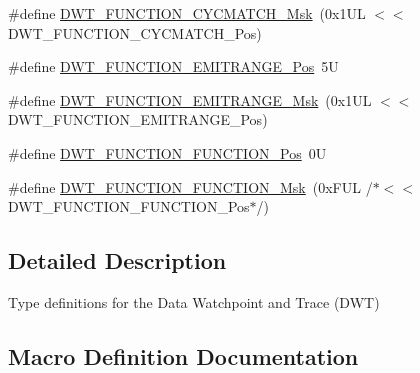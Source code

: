 \begin{DoxyCompactItemize}
\item 
\#define \hyperlink{group___c_m_s_i_s___d_w_t_ga8e2ed09bdd33a8f7f7ce0444f5f3bb25}{D\+W\+T\+\_\+\+F\+U\+N\+C\+T\+I\+O\+N\+\_\+\+C\+Y\+C\+M\+A\+T\+C\+H\+\_\+\+Msk}~(0x1\+U\+L $<$$<$ D\+W\+T\+\_\+\+F\+U\+N\+C\+T\+I\+O\+N\+\_\+\+C\+Y\+C\+M\+A\+T\+C\+H\+\_\+\+Pos)
\item 
\#define \hyperlink{group___c_m_s_i_s___d_w_t_ga41d5b332216baa8d29561260a1b85659}{D\+W\+T\+\_\+\+F\+U\+N\+C\+T\+I\+O\+N\+\_\+\+E\+M\+I\+T\+R\+A\+N\+G\+E\+\_\+\+Pos}~5U
\item 
\#define \hyperlink{group___c_m_s_i_s___d_w_t_gad46dd5aba29f2e28d4d3f50b1d291f41}{D\+W\+T\+\_\+\+F\+U\+N\+C\+T\+I\+O\+N\+\_\+\+E\+M\+I\+T\+R\+A\+N\+G\+E\+\_\+\+Msk}~(0x1\+U\+L $<$$<$ D\+W\+T\+\_\+\+F\+U\+N\+C\+T\+I\+O\+N\+\_\+\+E\+M\+I\+T\+R\+A\+N\+G\+E\+\_\+\+Pos)
\item 
\#define \hyperlink{group___c_m_s_i_s___d_w_t_ga5797b556edde2bbaa4d33dcdb1a891bb}{D\+W\+T\+\_\+\+F\+U\+N\+C\+T\+I\+O\+N\+\_\+\+F\+U\+N\+C\+T\+I\+O\+N\+\_\+\+Pos}~0U
\item 
\#define \hyperlink{group___c_m_s_i_s___d_w_t_ga3b2cda708755ecf5f921d08b25d774d1}{D\+W\+T\+\_\+\+F\+U\+N\+C\+T\+I\+O\+N\+\_\+\+F\+U\+N\+C\+T\+I\+O\+N\+\_\+\+Msk}~(0x\+F\+U\+L /$\ast$$<$$<$ D\+W\+T\+\_\+\+F\+U\+N\+C\+T\+I\+O\+N\+\_\+\+F\+U\+N\+C\+T\+I\+O\+N\+\_\+\+Pos$\ast$/)
\end{DoxyCompactItemize}


\subsection{Detailed Description}
Type definitions for the Data Watchpoint and Trace (D\+WT) 



\subsection{Macro Definition Documentation}
\mbox{\label{group___c_m_s_i_s___d_w_t_ga76f39e7bca3fa86a4dbf7b8f6adb7217}} 
